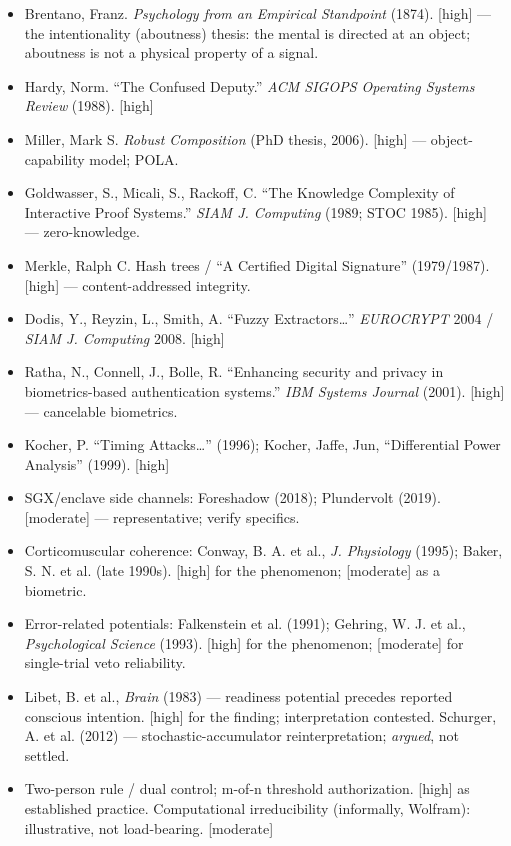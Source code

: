 \documentclass[11pt]{article}
\begin{document}
\begin{itemize}
\item Brentano, Franz. \emph{Psychology from an Empirical Standpoint} (1874). [high] — the intentionality (aboutness) thesis: the mental is directed at an object; aboutness is not a physical property of a signal.
\item Hardy, Norm. ``The Confused Deputy.'' \emph{ACM SIGOPS Operating Systems Review} (1988). [high]
\item Miller, Mark S. \emph{Robust Composition} (PhD thesis, 2006). [high] — object-capability model; POLA.
\item Goldwasser, S., Micali, S., Rackoff, C. ``The Knowledge Complexity of Interactive Proof Systems.'' \emph{SIAM J. Computing} (1989; STOC 1985). [high] — zero-knowledge.
\item Merkle, Ralph C. Hash trees /\allowbreak{} ``A Certified Digital Signature'' (1979/\allowbreak{}1987). [high] — content-addressed integrity.
\item Dodis, Y., Reyzin, L., Smith, A. ``Fuzzy Extractors…'' \emph{EUROCRYPT} 2004 /\allowbreak{} \emph{SIAM J. Computing} 2008. [high]
\item Ratha, N., Connell, J., Bolle, R. ``Enhancing security and privacy in biometrics-based authentication systems.'' \emph{IBM Systems Journal} (2001). [high] — cancelable biometrics.
\item Kocher, P. ``Timing Attacks…'' (1996); Kocher, Jaffe, Jun, ``Differential Power Analysis'' (1999). [high]
\item SGX/\allowbreak{}enclave side channels: Foreshadow (2018); Plundervolt (2019). [moderate] — representative; verify specifics.
\item Corticomuscular coherence: Conway, B. A. et al., \emph{J. Physiology} (1995); Baker, S. N. et al. (late 1990s). [high] for the phenomenon; [moderate] as a biometric.
\item Error-related potentials: Falkenstein et al. (1991); Gehring, W. J. et al., \emph{Psychological Science} (1993). [high] for the phenomenon; [moderate] for single-trial veto reliability.
\item Libet, B. et al., \emph{Brain} (1983) — readiness potential precedes reported conscious intention. [high] for the finding; interpretation contested. Schurger, A. et al. (2012) — stochastic-accumulator reinterpretation; \emph{argued}, not settled.
\item Two-person rule /\allowbreak{} dual control; m-of-n threshold authorization. [high] as established practice. Computational irreducibility (informally, Wolfram): illustrative, not load-bearing. [moderate]
\end{itemize}
\end{document}
